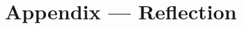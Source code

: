 \documentclass[12pt]{article}
\begin{document}
\newpage{}



\newpage{}
\section*{Appendix --- Reflection}




\end{document}
